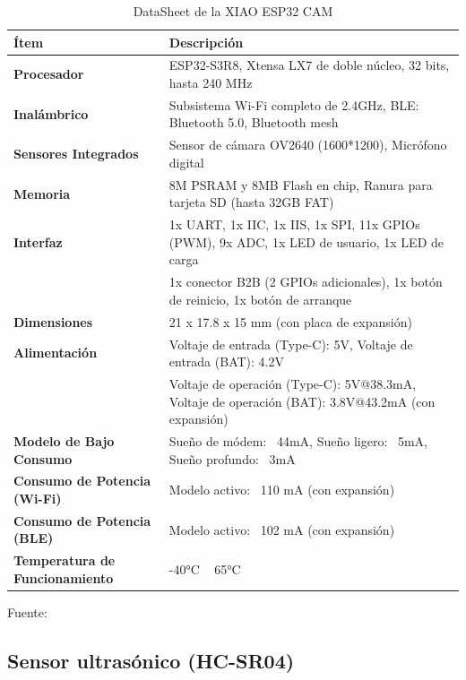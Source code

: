 \begin{table}[H]
    \centering
    \begin{tabularx}{\textwidth}{|l|X|} %
        \hline
        \textbf{Ítem} & \textbf{Descripción} \\ 
        \hline
        \textbf{Procesador} & ESP32-S3R8, Xtensa LX7 de doble núcleo, 32 bits, hasta 240 MHz \\ 
        \hline
        \textbf{Inalámbrico} & Subsistema Wi-Fi completo de 2.4GHz, BLE: Bluetooth 5.0, Bluetooth mesh \\ 
        \hline
        \textbf{Sensores Integrados} & Sensor de cámara OV2640 (1600*1200), Micrófono digital \\ 
        \hline
        \textbf{Memoria} & 8M PSRAM y 8MB Flash en chip, Ranura para tarjeta SD (hasta 32GB FAT) \\ 
        \hline
        \textbf{Interfaz} & 1x UART, 1x IIC, 1x IIS, 1x SPI, 11x GPIOs (PWM), 9x ADC, 1x LED de usuario, 1x LED de carga \\ 
        & 1x conector B2B (2 GPIOs adicionales), 1x botón de reinicio, 1x botón de arranque \\ 
        \hline
        \textbf{Dimensiones} & 21 x 17.8 x 15 mm (con placa de expansión) \\ 
        \hline
        \textbf{Alimentación} & Voltaje de entrada (Type-C): 5V, Voltaje de entrada (BAT): 4.2V \\ 
        & Voltaje de operación (Type-C): 5V@38.3mA, Voltaje de operación (BAT): 3.8V@43.2mA (con expansión) \\ 
        \hline
        \textbf{Modelo de Bajo Consumo} & Sueño de módem: ~44mA, Sueño ligero: ~5mA, Sueño profundo: ~3mA \\ 
        \hline
        \textbf{Consumo de Potencia (Wi-Fi)} & Modelo activo: ~110 mA (con expansión) \\ 
        \hline
        \textbf{Consumo de Potencia (BLE)} & Modelo activo: ~102 mA (con expansión) \\ 
        \hline
        \textbf{Temperatura de Funcionamiento} & -40°C ~ 65°C \\ 
        \hline
    \end{tabularx}
    \caption{DataSheet de la XIAO ESP32 CAM}{Fuente: ~\cite{xiaotabla}}
\end{table}

\subsection{Sensor ultrasónico (HC-SR04)}

